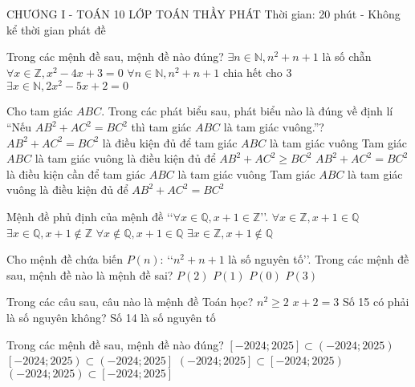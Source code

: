 \begin{name}
	{\tenchude}
	{CHƯƠNG I - TOÁN 10}
	{LỚP TOÁN THẦY PHÁT}
	{Thời gian: 20 phút - Không kể thời gian phát đề}
\end{name}

\TN
\begin{ex}
Trong các mệnh đề sau, mệnh đề nào đúng?
\choice
{$\exists n\in \mathbb{N},n^2+n+1$ là số chẵn}
{$\forall x\in \mathbb{Z},x^2-4x+3=0$}
{$\forall n\in \mathbb{N},n^2+n+1$ chia hết cho 3}
{$\exists x\in \mathbb{N},2x^2-5x+2=0$}
\end{ex}
\begin{ex}
Cho tam giác $ABC$. Trong các phát biểu sau, phát biểu nào là đúng về định lí “Nếu $AB^2+AC^2=BC^2$ thì tam giác $ABC$ là tam giác vuông.”?
\choice
{$AB^2+AC^2=BC^2$ là điều kiện đủ để tam giác $ABC$ là tam giác vuông}
{Tam giác $ABC$ là tam giác vuông là điều kiện đủ để $AB^2+AC^2\ge BC^2$}
{$AB^2+AC^2=BC^2$ là điều kiện cần để tam giác $ABC$ là tam giác vuông}
{Tam giác $ABC$ là tam giác vuông là điều kiện đủ để $AB^2+AC^2=BC^2$}
\end{ex}
\begin{ex}
Mệnh đề phủ định của mệnh đề \lq\lq $\forall x\in \mathbb{Q},x+1\in \mathbb{Z}$\rq\rq.
\choice
{$\forall x\in \mathbb{Z},x+1\in \mathbb{Q}$}
{$\exists x\in \mathbb{Q},x+1\notin \mathbb{Z}$}
{$\forall x\notin \mathbb{Q},x+1\in \mathbb{Q}$}
{$\exists x\in \mathbb{Z},x+1\notin \mathbb{Q}$}
\end{ex}
\begin{ex}
Cho mệnh đề chứa biến $P(n)$: \lq\lq$n^2+n+1$ là số nguyên tố\rq\rq. Trong các mệnh đề sau, mệnh đề nào là mệnh đề sai?
\choice
{$P(2)$}
{$P(1)$}
{$P(0)$}
{$P(3)$}
\end{ex}
\begin{ex}
Trong các câu sau, câu nào là mệnh đề Toán học?
\choice
{$n^2\ge 2$}
{$x+2=3$}
{Số 15 có phải là số nguyên không?}
{Số 14 là số nguyên tố}
\end{ex}
\begin{ex}
Trong các mệnh đề sau, mệnh đề nào đúng?
\choice
{$\left[-2024;2025\right]\subset \left(-2024;2025\right)$}
{$\left[-2024;2025\right)\subset \left(-2024;2025\right]$}
{$\left(-2024;2025\right]\subset \left[-2024;2025\right)$}
{$\left(-2024;2025\right)\subset \left[-2024;2025\right]$}
\end{ex}

